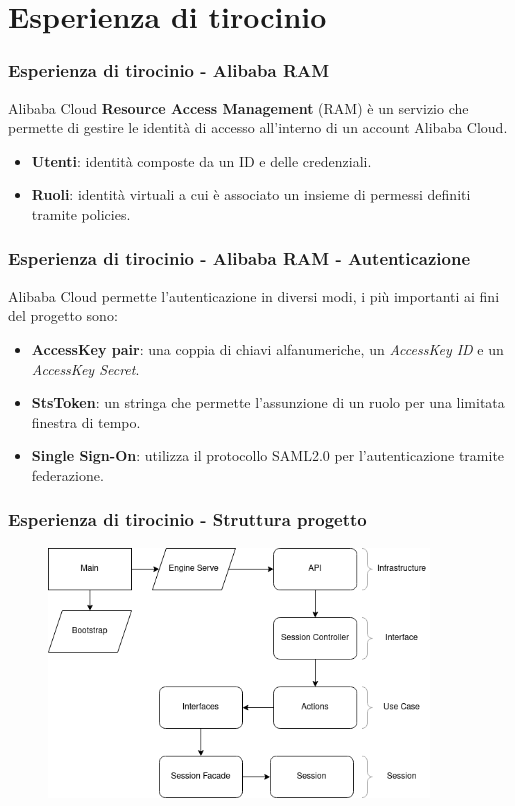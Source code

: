 \documentclass{beamer}
\begin{document}
\section{Esperienza di tirocinio}
\begin{frame}
 \frametitle{Esperienza di tirocinio - Alibaba RAM}
 Alibaba Cloud \textbf{Resource Access Management} (RAM) è un servizio che permette di gestire le identità di accesso all'interno di un account Alibaba Cloud.
 \pause

 \begin{itemize}
  \item \textbf{Utenti}: identità composte da un ID e delle credenziali.
  \pause
  \item \textbf{Ruoli}: identità virtuali a cui è associato un insieme di permessi definiti tramite policies.
 \end{itemize}
\end{frame}

\begin{frame}
 \frametitle{Esperienza di tirocinio - Alibaba RAM - Autenticazione}
 Alibaba Cloud permette l'autenticazione in diversi modi, i più importanti ai fini del progetto sono:
 \pause

 \begin{itemize}
  \item \textbf{AccessKey pair}: una coppia di chiavi alfanumeriche, un \textit{AccessKey ID} e un \textit{AccessKey Secret}.
  \pause
  \item \textbf{StsToken}: un stringa che permette l’assunzione di un ruolo per una limitata finestra di tempo.
  \pause
  \item \textbf{Single Sign-On}: utilizza il protocollo SAML2.0 per l’autenticazione tramite federazione.
 \end{itemize}
\end{frame}

\begin{frame}
 \frametitle{Esperienza di tirocinio - Struttura progetto}
 \begin{figure}
   \centering
   \includegraphics[width=0.9\textwidth]{Risorse/PianoForge.png}
  \end{figure}
\end{frame}
\end{document}
